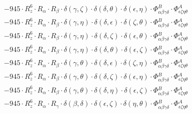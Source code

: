 \documentclass{article}
\begin{document}
\begin{equation}
\begin{array}{c}
 \\[0.2em] 		 - 945 \cdot R_{z}^{6} \cdot R_{\alpha{}} \cdot R_{\beta{}} \cdot \delta{}\left(\gamma{}, \zeta{}\right) \cdot \delta{}\left(\delta{}, \theta{}\right) \cdot \delta{}\left(\epsilon{}, \eta{}\right) \cdot \Phi{}^{B}_{\alpha{}\beta{}\gamma{}\delta{}} \cdot \Phi{}^{A}_{\epsilon{}\zeta{}\eta{}\theta{}} 
 \\[0.2em] 		 - 945 \cdot R_{z}^{6} \cdot R_{\alpha{}} \cdot R_{\beta{}} \cdot \delta{}\left(\gamma{}, \eta{}\right) \cdot \delta{}\left(\delta{}, \epsilon{}\right) \cdot \delta{}\left(\zeta{}, \theta{}\right) \cdot \Phi{}^{B}_{\alpha{}\beta{}\gamma{}\delta{}} \cdot \Phi{}^{A}_{\epsilon{}\zeta{}\eta{}\theta{}} 
 \\[0.2em] 		 - 945 \cdot R_{z}^{6} \cdot R_{\alpha{}} \cdot R_{\beta{}} \cdot \delta{}\left(\gamma{}, \eta{}\right) \cdot \delta{}\left(\delta{}, \zeta{}\right) \cdot \delta{}\left(\epsilon{}, \theta{}\right) \cdot \Phi{}^{B}_{\alpha{}\beta{}\gamma{}\delta{}} \cdot \Phi{}^{A}_{\epsilon{}\zeta{}\eta{}\theta{}} 
 \\[0.2em] 		 - 945 \cdot R_{z}^{6} \cdot R_{\alpha{}} \cdot R_{\beta{}} \cdot \delta{}\left(\gamma{}, \eta{}\right) \cdot \delta{}\left(\delta{}, \theta{}\right) \cdot \delta{}\left(\epsilon{}, \zeta{}\right) \cdot \Phi{}^{B}_{\alpha{}\beta{}\gamma{}\delta{}} \cdot \Phi{}^{A}_{\epsilon{}\zeta{}\eta{}\theta{}} 
 \\[0.2em] 		 - 945 \cdot R_{z}^{6} \cdot R_{\alpha{}} \cdot R_{\beta{}} \cdot \delta{}\left(\gamma{}, \theta{}\right) \cdot \delta{}\left(\delta{}, \epsilon{}\right) \cdot \delta{}\left(\zeta{}, \eta{}\right) \cdot \Phi{}^{B}_{\alpha{}\beta{}\gamma{}\delta{}} \cdot \Phi{}^{A}_{\epsilon{}\zeta{}\eta{}\theta{}} 
 \\[0.2em] 		 - 945 \cdot R_{z}^{6} \cdot R_{\alpha{}} \cdot R_{\beta{}} \cdot \delta{}\left(\gamma{}, \theta{}\right) \cdot \delta{}\left(\delta{}, \zeta{}\right) \cdot \delta{}\left(\epsilon{}, \eta{}\right) \cdot \Phi{}^{B}_{\alpha{}\beta{}\gamma{}\delta{}} \cdot \Phi{}^{A}_{\epsilon{}\zeta{}\eta{}\theta{}} 
 \\[0.2em] 		 - 945 \cdot R_{z}^{6} \cdot R_{\alpha{}} \cdot R_{\beta{}} \cdot \delta{}\left(\gamma{}, \theta{}\right) \cdot \delta{}\left(\delta{}, \eta{}\right) \cdot \delta{}\left(\epsilon{}, \zeta{}\right) \cdot \Phi{}^{B}_{\alpha{}\beta{}\gamma{}\delta{}} \cdot \Phi{}^{A}_{\epsilon{}\zeta{}\eta{}\theta{}} 
 \\[0.2em] 		 - 945 \cdot R_{z}^{6} \cdot R_{\alpha{}} \cdot R_{\gamma{}} \cdot \delta{}\left(\beta{}, \delta{}\right) \cdot \delta{}\left(\epsilon{}, \zeta{}\right) \cdot \delta{}\left(\eta{}, \theta{}\right) \cdot \Phi{}^{B}_{\alpha{}\beta{}\gamma{}\delta{}} \cdot \Phi{}^{A}_{\epsilon{}\zeta{}\eta{}\theta{}} 

\end{array}
\end{equation}
\end{document}
